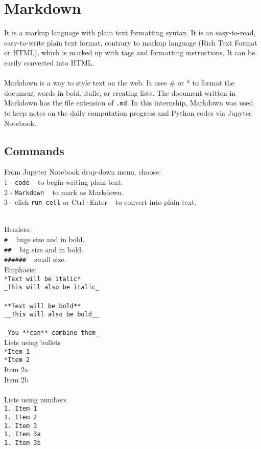 \documentclass{article}
\begin{document}
{{\newpage
\section{Markdown}
It is a markup language with plain text formatting syntax. It is an easy-to-read, easy-to-write plain text format, contrary to markup language (Rich Text Format or HTML), which is marked up with tags and formatting instructions. It can be easily converted into HTML. \\
\\
Markdown is a way to style text on the web. It uses \# or * to format the document words  in bold, italic, or creating lists. 
The document written in Markdown has the file extension of \texttt{.md}. In this internship, Markdown was used to keep notes on the daily computation progress and Python codes via Jupyter Notebook. 

\subsection{Commands}
From Jupyter Notebook drop-down menu, choose:\\
1 - \texttt{code} ~ to begin writing plain text.\\
2 - \texttt{Markdown} ~ to mark as Markdown.\\
3 - click \texttt{run cell} or Ctrl+Enter ~ to convert into plain text.\\
\\
\begin{multicols}{2}

Headers:\\
\texttt{\#} ~ huge size and in bold.\\
\texttt{\#\#} ~ big size and in bold.\\
\texttt{\#\#\#\#\#\#} ~ small size.\\

Emphasis:\\
\texttt{*Text will be italic*}\\
\texttt{\_This will also be italic\_}\\
\\
\texttt{**Text will be bold**}\\
\texttt{\_\_This will also be bold\_\_}\\
\\
\texttt{\_You **can** combine them\_}\\
Lists using bullets\\
\texttt{*Item 1}\\
\texttt{*Item 2}\\
\indent * Item 2a\\
\indent * Item 2b\\
\\
Lists using numbers\\
\texttt{1. Item 1}\\
\texttt{1. Item 2}\\
\texttt{1. Item 3}\\
\indent \texttt{1. Item 3a}\\
\indent \texttt{1. Item 3b}\\
\end{multicols}\\

}}
\end{document}
